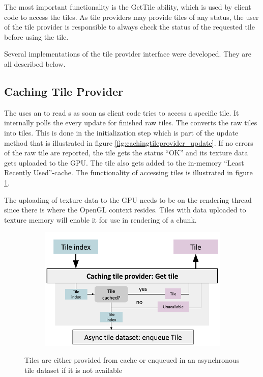 The most important functionality is the GetTile ability, which is used by client code to access the tiles. As tile providers may provide tiles of any status, the user of the tile provider is responsible to always check the status of the requested tile before using the tile. 

Several implementations of the tile provider interface were developed. They are all described below.

\subsection{Caching Tile Provider}
The  uses an  to read s as soon as client code tries to access a specific tile. It internally polls the  every update for finished raw tiles. The  converts the raw tiles into tiles. This is done in the initialization step which is part of the update method that is illustrated in figure \ref{fig:cachingtileprovider_update}. If no errors of the raw tile are reported, the tile gets the status ``OK'' and its texture data gets uploaded to the GPU. The tile also gets added to the in-memory ``Least Recently Used''-cache. The functionality of accessing tiles is illustrated in figure \ref{fig:cachingtileprovider_gettile}.

The uploading of texture data to the GPU needs to be on the rendering thread since there is where the OpenGL context resides. Tiles with data uploaded to texture memory will enable it for use in rendering of a chunk.

\begin{figure}[htbp]
    \centering
    \begin{subfigure}[bt]{0.7\textwidth}
        \includegraphics[width=\textwidth]{figures/implementation/tileprovider/cachingtileprovider_gettile.pdf}
    \end{subfigure}
    \caption{Tiles are either provided from cache or enqueued in an asynchronous tile dataset if it is not available}
    \label{fig:cachingtileprovider_gettile}
\end{figure}

